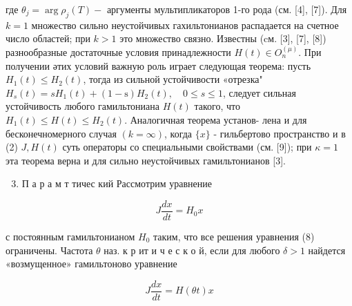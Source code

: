 \documentclass[10pt]{article}
\begin{document}
где $\theta_{j}=\arg \rho_{j}(T)-$ аргументы мультипликаторов 1-го рода (см. [4], [7]). Для $k=1$ множество сильно неустойчивых гахильтонианов распадается на счетное число областей; при $k>1$ это множество связно. Известны (cм. [3], [7], [8]) разнообразные достаточные условия принадлежности $H(t) \in O_{n}^{(\mu)}$. При получении әтих условий важную роль играет следующая теорема: пусть $H_{1}(t) \leqslant H_{2}(t)$, тогда из сильной устойчивости «отрезка" $H_{s}(t)=s H_{1}(t)+(1-\mathrm{s}) H_{2}(t), \quad 0 \leqslant s \leqslant 1$, следует сильная устойчивость любого гамильтониана $H(t)$ такого, что $H_{1}(t) \leqslant H(t) \leqslant H_{2}(t)$. Аналогичная теорема установ- лена и для бесконечномерного случая $(k=\infty)$, когда $\{x\}$ - гильбертово пространство и в (2) $J, H(t)$ суть операторы со специальными свойствами (см. [9]); при $\kappa=1$ эта теорема верна и для сильно неустойчивых гамильтонианов [3].



\begin{enumerate}

  \setcounter{enumi}{2}

  \item П а р а м т тичес кий Рассмотрим уравнение

\end{enumerate}



\[

J \frac{d x}{d t}=H_{0} x

\]



с постоянным гамильтонианом $H_{0}$ таким, что все решения уравнения (8) ограничены. Частота $\theta$ наз. к р ит и ч е с к о й, если для любого $\delta>1$ найдется «возмущенное» гамильтоново уравнение



\[

J \frac{d x}{d t}=H(\theta t) x

\]
\end{document}
